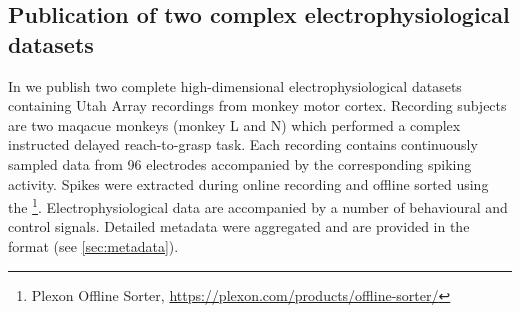 % 

\subsection{Publication of two complex electrophysiological datasets}
In \citet{Brochier_2018} we publish two complete high-dimensional electrophysiological datasets containing Utah Array recordings from monkey motor cortex. Recording subjects are two maqacue monkeys (monkey L and N) which performed a complex instructed delayed reach-to-grasp task. Each recording contains continuously sampled data from 96 electrodes accompanied by the corresponding spiking activity. Spikes were extracted during online recording and offline sorted using the \footnote{Plexon Offline Sorter, \url{https://plexon.com/products/offline-sorter/}}. Electrophysiological data are accompanied by a number of behavioural and control signals. Detailed metadata were aggregated and are provided in the  format (see \cref{sec:metadata}).

